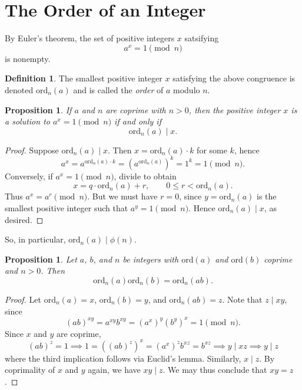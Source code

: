 \documentclass{amsbook}
\numberwithin{section}{chapter}
\theoremstyle{plain}
\newtheorem{prop}[thm]{Proposition}
\theoremstyle{definition}
\newtheorem{defn}[thm]{Definition}
\def\ord{\text{ord}}
\begin{document}
\section{The Order of an Integer}
By Euler's theorem, the set of positive integers $x$
satsifying
\[a^x = 1\pmod n\]
is nonempty.
\begin{defn}
The smallest positive integer $x$ satisfying the above congruence
is denoted $\ord_n(a)$ and is called the \textit{order}
of $a$ modulo $n$.
\end{defn}
\begin{prop}
If $a$ and $n$ are coprime with $n > 0$, then the positive integer
$x$ is a solution to $a^x = 1\pmod n$ if and only if
\[\ord_n(a)\mid x.\]
\end{prop}
\begin{proof}
Suppose $\ord_n(a)\mid x$. Then $x = \ord_n(a)\cdot k$ for some $k$,
hence
\[a^x = a^{\ord_n(a)\cdot k} = (a^{\ord_n(a)})^k = 1^k = 1\pmod n.\]
Conversely, if $a^x = 1\pmod n$, divide to obtain
\[x = q\cdot\ord_n(a) + r,\qquad 0\le r <\ord_n(a).\]
Thus $a^x = a^r\pmod n$. But we must have $r = 0$,
since $y = \ord_n(a)$ is the smallest positive integer such that
$a^y = 1\pmod n$. Hence $\ord_n(a)\mid x$, as desired.
\end{proof}
So, in particular, $\ord_n(a)\mid\phi(n)$.
\begin{prop}
Let $a$, $b$, and $n$ be integers
with $\ord(a)$ and $\ord(b)$ coprime and $n > 0$. Then
\[\ord_n(a)\ord_n(b) = \ord_n(ab).\]
\end{prop}
\begin{proof}
Let $\ord_n(a) = x$, $\ord_n(b) = y$, and $\ord_n(ab) = z$.
Note that $z\mid xy$, since
\[(ab)^{xy} = a^{xy}b^{xy} = (a^x)^y(b^y)^x = 1\pmod n.\]
Since $x$ and $y$ are coprime,
\[(ab)^z = 1 \implies 1 = ((ab)^z)^x 
= (a^x)^zb^{xz} = b^{xz}\implies y\mid xz\implies y\mid z\]
where the third implication follows via Euclid's lemma.
Similarly, $x\mid z$. By coprimality of $x$ and $y$ again,
we have $xy\mid z$. We may thus conclude that $xy = z$.
\end{proof}
\end{document}

